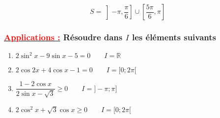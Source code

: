 \documentclass[a4paper,12pt]{article}
\begin{document}
\[
    \boxed{S = \left]-\pi,\frac{\pi}{6}\right] \cup \left[\frac{5\pi}{6},\pi\right]}
\]

\subsubsection*{\underline{\textcolor{red}{Applications :}} Résoudre dans $I$ les éléments suivants}

\begin{enumerate}
    \item $2\sin^2 x - 9\sin x - 5 = 0 \qquad I = \mathbb{R}$

    \item $2\cos 2x + 4\cos x - 1 = 0 \qquad I = [0 ; 2\pi[$

    \item $\dfrac{1 - 2\cos x}{2\sin x - \sqrt{3}} \geq 0 \qquad I = ]-\pi ; \pi]$

    \item $2\cos^2 x + \sqrt{3}\cos x \geq 0 \qquad I = [0 ; 2\pi[$
\end{enumerate}
\end{document}
